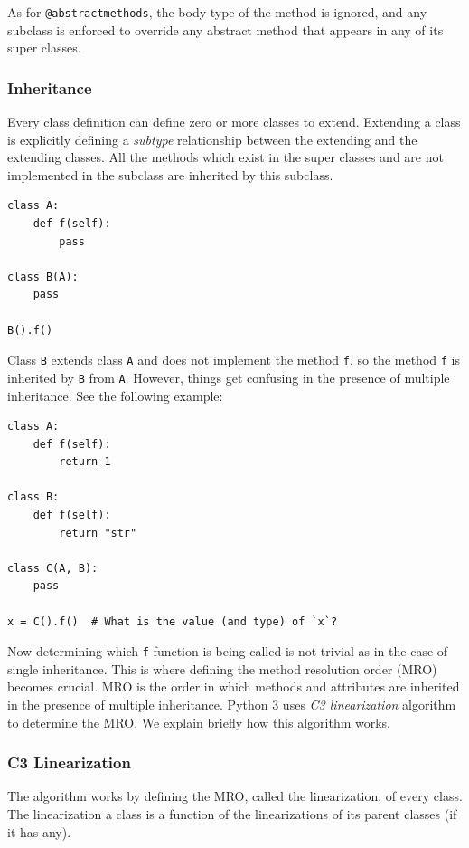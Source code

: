 As for \lstinline|@abstractmethods|, the body type of the method is ignored, and any subclass is enforced to override any abstract method that appears in any of its super classes.

\subsubsection{Inheritance}
Every class definition can define zero or more classes to extend. Extending a class is explicitly defining a \textit{subtype} relationship between the extending and the extending classes. All the methods which exist in the super classes and are not implemented in the subclass are inherited by this subclass.
\begin{lstlisting}
class A:
	def f(self):
		pass

class B(A):
	pass
	
B().f()
\end{lstlisting}

Class \lstinline|B| extends class \lstinline|A| and does not implement the method \lstinline|f|, so the method \lstinline|f| is inherited by \lstinline|B| from \lstinline|A|. However, things get confusing in the presence of multiple inheritance. See the following example:

\begin{lstlisting}
class A:
	def f(self):
		return 1

class B:
	def f(self):
		return "str"
		
class C(A, B):
	pass
	
x = C().f()  # What is the value (and type) of `x`?
\end{lstlisting}

Now determining which \lstinline|f| function is being called is not trivial as in the case of single inheritance. This is where defining the method resolution order (MRO) becomes crucial. MRO is the order in which methods and attributes are inherited in the presence of multiple inheritance. Python 3 uses \textit{C3 linearization} algorithm to determine the MRO. We explain briefly how this algorithm works.

\subsubsection{C3 Linearization}
The algorithm works by defining the MRO, called the linearization, of every class. The linearization a class is a function of the linearizations of its parent classes (if it has any). \\

